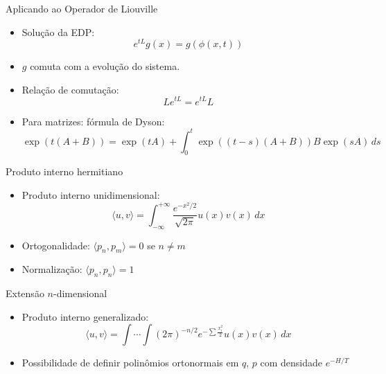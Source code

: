 \begin{frame}{Aplicando ao Operador de Liouville}
	\begin{itemize}
		\item Solução da EDP:
		      \begin{equation*}
		      	e^{tL}g(x) = g(\phi(x,t))
		      \end{equation*}
		\item $g$ comuta com a evolução do sistema.
		\item Relação de comutação:
		      \begin{equation*}
		      	Le^{tL} = e^{tL}L
		      \end{equation*}
		\item Para matrizes: fórmula de Dyson:
		      \begin{equation*}
		      	\exp(t(A+B)) = \exp(tA) + \int_0^t \exp((t-s)(A+B)) B \exp(sA)\, ds
		      \end{equation*}
	\end{itemize}
\end{frame}


\begin{frame}{Produto interno hermitiano}
	\begin{itemize}
		\item Produto interno unidimensional:
		      \begin{equation*}
		      	\langle u, v \rangle = \int_{-\infty}^{+\infty} \frac{e^{-x^2/2}}{\sqrt{2\pi}} u(x)v(x)\, dx
		      \end{equation*}
		\item Ortogonalidade: $\langle p_n, p_m \rangle = 0$ se $n \neq m$
		\item Normalização: $\langle p_n, p_n \rangle = 1$
	\end{itemize}
\end{frame}

\begin{frame}{Extensão $n$-dimensional}
	\begin{itemize}
		\item Produto interno generalizado:
		      \begin{equation*}
		      	\langle u, v \rangle = \int \cdots \int (2\pi)^{-n/2} e^{-\sum \frac{x_i^2}{2}} u(x)v(x)\, dx
		      \end{equation*}
		\item Possibilidade de definir polinômios ortonormais em $q$, $p$ com densidade $e^{-H/T}$
	\end{itemize}
\end{frame}

